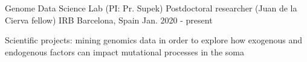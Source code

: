 

\begin{cventries}

  \cventry
    {Genome Data Science Lab (PI: Pr. Supek)} %
    {Postdoctoral researcher (Juan de la Cierva fellow)} %
    {IRB Barcelona, Spain} %
    {Jan. 2020 - present} %
    {
      \begin{cvitems} %
        \item {Scientific projects: mining genomics data in order to explore how exogenous and endogenous factors can impact mutational processes in the soma}
      \end{cvitems}
    }



\end{cventries}

